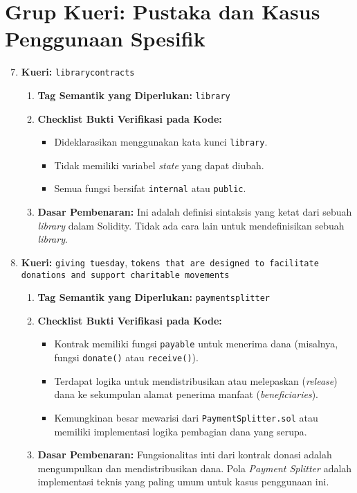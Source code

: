 \section{Grup Kueri: Pustaka dan Kasus Penggunaan Spesifik}
\begin{enumerate}
	\setcounter{enumi}{6}
	\item \textbf{Kueri:} \texttt{library\textunderscore contracts}
	      \begin{enumerate}
		      \item \textbf{Tag Semantik yang Diperlukan:} \texttt{library}
		      \item \textbf{Checklist Bukti Verifikasi pada Kode:}
		            \begin{itemize}
			            \item Dideklarasikan menggunakan kata kunci \texttt{library}.
			            \item Tidak memiliki variabel \textit{state} yang dapat diubah.
			            \item Semua fungsi bersifat \texttt{internal} atau \texttt{public}.
		            \end{itemize}
		      \item \textbf{Dasar Pembenaran:} Ini adalah definisi sintaksis yang ketat dari sebuah \textit{library} dalam Solidity. Tidak ada cara lain untuk mendefinisikan sebuah \textit{library}.
	      \end{enumerate}
	\item \textbf{Kueri:} \texttt{giving tuesday}, \texttt{tokens that are designed to facilitate donations and support charitable movements}
	      \begin{enumerate}
		      \item \textbf{Tag Semantik yang Diperlukan:} \texttt{payment\textunderscore splitter}
		      \item \textbf{Checklist Bukti Verifikasi pada Kode:}
		            \begin{itemize}
			            \item Kontrak memiliki fungsi \texttt{payable} untuk menerima dana (misalnya, fungsi \texttt{donate()} atau \texttt{receive()}).
			            \item Terdapat logika untuk mendistribusikan atau melepaskan (\textit{release}) dana ke sekumpulan alamat penerima manfaat (\textit{beneficiaries}).
			            \item Kemungkinan besar mewarisi dari \texttt{PaymentSplitter.sol} atau memiliki implementasi logika pembagian dana yang serupa.
		            \end{itemize}
		      \item \textbf{Dasar Pembenaran:} Fungsionalitas inti dari kontrak donasi adalah mengumpulkan dan mendistribusikan dana. Pola \textit{Payment Splitter} adalah implementasi teknis yang paling umum untuk kasus penggunaan ini.
	      \end{enumerate}
\end{enumerate}